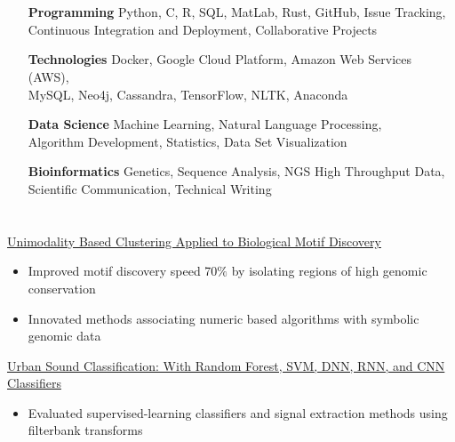 \documentclass[hidelinks, 11pt]{article}
\begin{document}
\section*{}
\begin{addmargin}{1.6in}
  \begin{itemize}\setlength\itemsep{-4pt}
    \item[{\bf Programming}]{Python, C, R, SQL, MatLab, Rust, GitHub, Issue Tracking, \\ 
                             Continuous Integration and Deployment, Collaborative Projects}
    \item[{\bf Technologies}]{Docker, Google Cloud Platform, Amazon Web Services (AWS), \\
                              MySQL, Neo4j, Cassandra, TensorFlow, NLTK, Anaconda}
    \item[{\bf Data Science}]{Machine Learning, Natural Language Processing, \\
                              Algorithm Development, Statistics, Data Set Visualization}
    \item[{\bf Bioinformatics}]{Genetics, Sequence Analysis, NGS High Throughput Data, \\
                                Scientific Communication, Technical Writing}
  \end{itemize}
\end{addmargin}
\vspace{-6pt}

\section*{}
\begin{addmargin}{.5in}
  {\href{https://benjamindoran.github.io/motif-paper/}{\color{blue}Unimodality Based Clustering Applied to Biological Motif Discovery}}
  \begin{itemize}\setlength\itemsep{-4pt}
    \item{Improved motif discovery speed 70$\%$ by isolating regions of high genomic conservation} 
    \item{Innovated methods associating numeric based algorithms with symbolic genomic data}
  \end{itemize}
  {\href{https://github.com/BenjaminDoran/Urban-Sound-Classification/}{\color{blue}Urban Sound Classification: With Random Forest, SVM, DNN, RNN, and CNN Classifiers}}
  \begin{itemize}\setlength\itemsep{-4pt}
    \item{Evaluated supervised-learning classifiers and signal extraction methods using filterbank transforms}
  \end{itemize}
\end{addmargin}
\vspace{-6pt}
\end{document}
